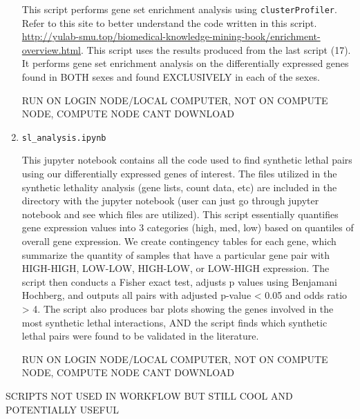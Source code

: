 \documentclass[10pt]{article}
\begin{document}
\begin{enumerate}
This script performs gene set enrichment analysis using \texttt{clusterProfiler}. Refer to this site to better understand the code written in this script.
\url{http://yulab-smu.top/biomedical-knowledge-mining-book/enrichment-overview.html}. This script uses the results produced from the last script (17). It performs gene set enrichment analysis on the differentially expressed genes found in BOTH sexes and found EXCLUSIVELY in each of the sexes.

RUN ON LOGIN NODE/LOCAL COMPUTER, NOT ON COMPUTE NODE, COMPUTE NODE CANT DOWNLOAD

\item\texttt{sl\_analysis.ipynb}

This jupyter notebook contains all the code used to find synthetic lethal pairs using our differentially expressed genes of interest. The files utilized in the synthetic lethality analysis (gene lists, count data, etc) are included in the directory with the jupyter notebook (user can just go through jupyter notebook and see which files are utilized). This script essentially quantifies gene expression values into 3 categories (high, med, low) based on quantiles of overall gene expression. We create contingency tables for each gene, which summarize the quantity of samples that have a particular gene pair with HIGH-HIGH, LOW-LOW, HIGH-LOW, or LOW-HIGH expression. The script then conducts a Fisher exact test, adjusts p values using Benjamani Hochberg, and outputs all pairs with adjusted p-value < 0.05 and odds ratio > 4. The script also produces bar plots showing the genes involved in the most synthetic lethal interactions, AND the script finds which synthetic lethal pairs were found to be validated in the literature.

RUN ON LOGIN NODE/LOCAL COMPUTER, NOT ON COMPUTE NODE, COMPUTE NODE CANT DOWNLOAD
	
\end{enumerate}

SCRIPTS NOT USED IN WORKFLOW BUT STILL COOL AND POTENTIALLY USEFUL
\end{document}
